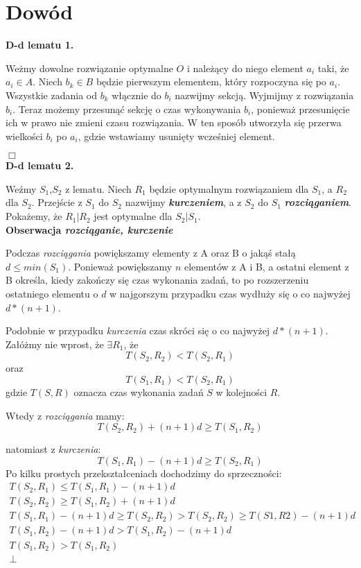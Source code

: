 \documentclass[11pt, wide]{article}
\begin{document}
    \section{Dowód}
    
    \textbf{D-d lematu 1.}

    Weżmy dowolne rozwiązanie optymalne $O$ i należący do niego 
    element $a_i$ taki, że $a_i \in A$. Niech $b_k \in B$ będzie pierwszym elementem, który rozpoczyna się po $a_i$. 
    Wszystkie zadania od $b_k$ włącznie do $b_i$ nazwijmy sekcją. 
    Wyjmijmy z rozwiązania $b_i$. Teraz możemy przesunąć sekcję o czas wykonywania $b_i$, ponieważ przesunięcie ich w prawo
    nie zmieni czasu rozwiązania. W ten sposób utworzyła się przerwa wielkości $b_i$ po $a_i$, gdzie wstawiamy usunięty wcześniej element.
    
    \hspace*{12cm} $\Box$
    \\
    
    \textbf{D-d lematu 2.}

    Weźmy $S_1$,$S_2$ z lematu. Niech $R_1$ będzie optymalnym
    rozwiązaniem dla $S_1$, a $R_2$ dla $S_2$. Przejście z $S_1$ do $S_2$ nazwijmy
    \textbf{\textit{kurczeniem}}, a z $S_2$ do $S_1$ \textbf{\textit{rozciąganiem}}. Pokażemy, że
    $R_1|R_2$ jest optymalne dla $S_2|S_1$.     
    \\

    \textbf{Obserwacja \textit{rozciąganie, kurczenie}}

    Podczas \textit{rozciągania} powiększamy elementy z A oraz B
    o jakąś stałą $d \leq min(S_1)$. Ponieważ powiększamy $n$ elementów z A i B, a ostatni element z B 
    określa, kiedy zakończy się czas wykonania zadań, to po rozszerzeniu ostatniego elementu o $d$ w najgorszym 
    przypadku czas wydłuży się o co najwyżej $d*(n+1)$.

    Podobnie w przypadku \textit{kurczenia} czas skróci się o co najwyżej $d*(n+1)$.
    \\

    Załóżmy nie wprost, że $\exists R_1$, że \
    $$T(S_2, R_2) < T(S_2, R_1)$$ oraz $$T(S_1, R_1) < T(S_2, R_1)$$ gdzie $T(S,R)$ 
    oznacza czas wykonania zadań $S$ w kolejności $R$.

    Wtedy z \textit{rozciągania} mamy: $$T(S_2, R_2) + (n+1)d \geq T(S_1, R_2) $$

    natomiast z \textit{kurczenia}: $$T(S_1, R_1) - (n+1)d \geq T(S_2, R_1)$$
    Po kilku prostych przekształceniach dochodzimy do sprzeczności:
    \begin{gather*}
        T(S_2, R_1) \leq T(S_1, R_1) - (n+1)d \\
        T(S_2, R_2) \geq T(S_1, R_2) + (n+1)d \\
        T(S_1, R_1) - (n+1)d \geq T(S_2, R_2) > T(S_2, R_2) \geq T(S1, R2) - (n+1)d \\
        T(S_1, R_2) - (n+1)d > T(S_1, R_2) - (n+1)d \\
        T(S_1, R_2) > T(S_1, R_2) \\
        \bot
    \end{gather*}
\end{document}
